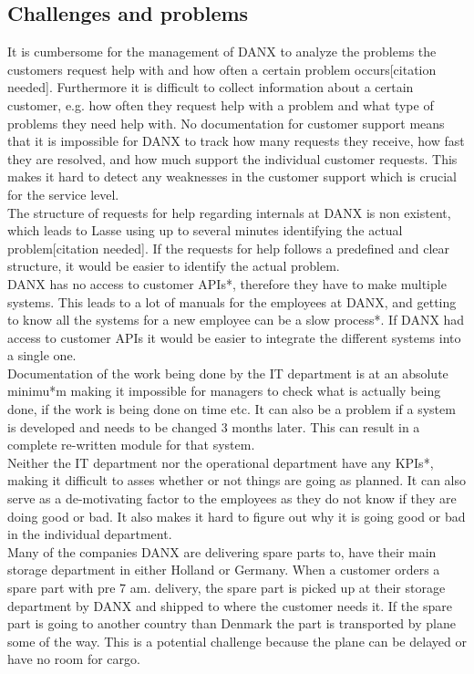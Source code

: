 \subsection{Challenges and problems}
It is cumbersome for the management of DANX to analyze the problems the customers request help with and how often a certain problem occurs[citation needed]. Furthermore it is difficult to collect information about a certain customer, e.g. how often they request help with a problem and what type of problems they need help with. No documentation for customer support means that it is impossible for DANX to track how many requests they receive, how fast they are resolved, and how much support the individual customer requests.
This makes it hard to detect any weaknesses in the customer support which is crucial for the service level. \\
The structure of requests for help regarding internals at DANX is non existent, which leads to Lasse using up to several minutes identifying the actual problem[citation needed]. If the requests for help follows a predefined and clear structure, it would be easier to identify the actual problem. \\
DANX has no access to customer APIs*, therefore they have to make multiple systems. This leads to a lot of manuals for the employees at DANX, and getting to know all the systems for a new employee can be a slow process*. If DANX had access to customer APIs it would be easier to integrate the different systems into a single one. \\
Documentation of the work being done by the IT department is at an absolute minimu*m making it impossible for managers to check what is actually being done, if the work is being done on time etc.
It can also be a problem if a system is developed and needs to be changed 3 months later. This can result in a complete re-written module for that system\cite{lahib001}. \\
Neither the IT department nor the operational department have any KPIs*, making it difficult to asses whether or not things are going as planned. It can also serve as a de-motivating factor to the employees as they do not know if they are doing good or bad. It also makes it hard to figure out why it is going good or bad in the individual department. \\
Many of the companies DANX are delivering spare parts to, have their main storage department in either Holland\cite{gert001} or Germany\cite{gert002}. When a customer orders a spare part with pre 7 am. delivery, the spare part is picked up at their storage department by DANX and shipped to where the customer needs it. If the spare part is going to another country than Denmark the part is transported by plane some of the way. This is a potential challenge because the plane can be delayed or have no room for cargo.

